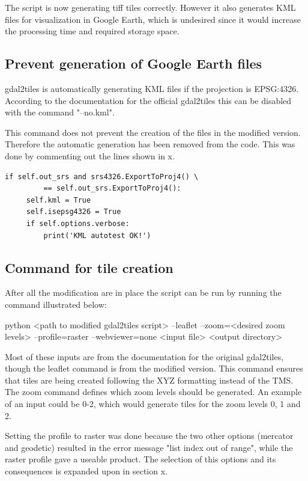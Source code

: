 The script is now generating tiff tiles correctly. However it also generates KML files for visualization in Google Earth, which is undesired since it would increase the processing time and required storage space. 
\subsection{Prevent generation of Google Earth files}
gdal2tiles is automatically generating KML files if the projection is EPSG:4326. According to the documentation for the official gdal2tiles this can be disabled with the command "--no.kml".
\citep{gdal2tilesDoc}


This command does not prevent the creation of the files in the modified version. Therefore the automatic generation has been removed from the code. This was done by commenting out the lines shown in x. 

\begin{lstlisting}[language=iPython, caption={Increasing the bit depth}, label= KML,escapechar=|]
 if self.out_srs and srs4326.ExportToProj4() \
         == self.out_srs.ExportToProj4():
     self.kml = True
     self.isepsg4326 = True
     if self.options.verbose:
         print('KML autotest OK!')
\end{lstlisting}
        
\subsection{Command for tile creation}

After all the modification are in place the script can be run by running the command illustrated below:


python <path to modified gdal2tiles script> --leaflet --zoom=<desired zoom levels> --profile=raster --webviewer=none <input file> <output directory>


Most of these inputs are from the documentation for the original gdal2tiles, though the leaflet command is from the modified version. This command ensures that tiles are being created following the XYZ formatting instead of the TMS. The zoom command defines which zoom levels should be generated. An example of an input could be 0-2, which would generate tiles for the zoom levels 0, 1 and 2. 

Setting the profile to raster was done because the two other options (mercator and geodetic) resulted in the error message "list index out of range", while the raster profile gave a useable product. The selection of this options and its consequences is expanded upon in section x.  

